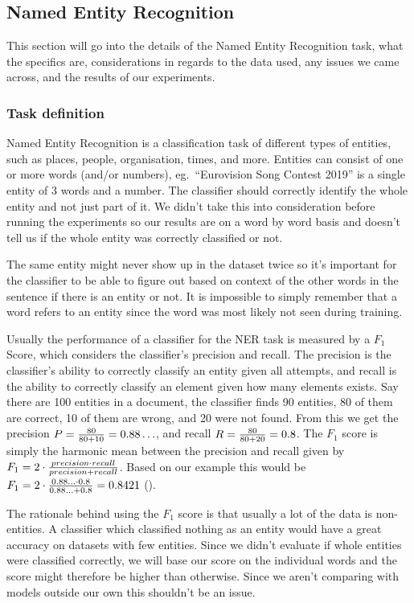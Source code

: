 
\subsection{Named Entity Recognition}

This section will go into the details of the Named Entity Recognition task, what
the specifics are, considerations in regards to the data used, any issues we
came across, and the results of our experiments.

\subsubsection{Task definition}

Named Entity Recognition is a classification task of different types of
entities, such as places, people, organisation, times, and more. Entities can
consist of one or more words (and/or numbers), eg.\ ``Eurovision Song Contest
2019'' is a single entity of 3 words and a number. The classifier should
correctly identify the whole entity and not just part of it. We didn't take this
into consideration before running the experiments so our results are on a word
by word basis and doesn't tell us if the whole entity was correctly classified
or not.

The same entity might never show up in the dataset twice so it's important for
the classifier to be able to figure out based on context of the other words in
the sentence if there is an entity or not. It is impossible to simply remember
that a word refers to an entity since the word was most likely not seen during
training.

Usually the performance of a classifier for the NER task is measured by a $F_1$
Score, which considers the classifier's precision and recall. The precision is
the classifier's ability to correctly classify an entity given all attempts, and
recall is the ability to correctly classify an element given how many elements
exists. Say there are 100 entities in a document, the classifier finds 90
entities, 80 of them are correct, 10 of them are wrong, and 20 were not found.
From this we get the precision $P = {80 \over 80 + 10} = 0.88\ldots$, and recall
$R = {80 \over 80 + 20} = 0.8$. The $F_1$ score is simply the harmonic mean
between the precision and recall given by $F_1 = 2 \cdot {precision \cdot recall
\over precision + recall}$. Based on our example this would be $F_1 = 2 \cdot
{0.88 \ldots \cdot 0.8 \over 0.88\ldots + 0.8} = 0.8421$ (\cite{f-measure}).

The rationale behind using the $F_1$ score is that usually a lot of the data is
non-entities. A classifier which classified nothing as an entity would have a
great accuracy on datasets with few entities. Since we didn't evaluate if whole
entities were classified correctly, we will base our score on the individual
words and the score might therefore be higher than otherwise. Since we aren't
comparing with models outside our own this shouldn't be an issue.

